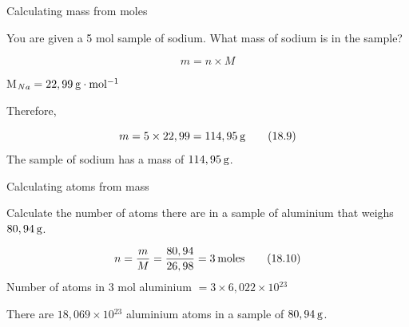    \noindent
\label{m38717*secfhsst!!!underscore!!!id451}\vspace{.5cm} 
      \noindent
      \begin{wex}{Calculating mass from moles }{
\label{m38717*probfhsst!!!underscore!!!id452}
      \label{m38717*id277751}You are given a 5 mol sample of sodium. What mass of sodium is in the sample?\par }
{
      \label{m38717*id277797}\nopagebreak\noindent{}
        
    \begin{equation}
    m=n\ensuremath{\times}M\tag{18.8}
      \end{equation}
      \item  
      \label{m38717*id277822}M${}_{Na}=22,99\phantom{\rule{2pt}{0ex}}\mathrm{g}\ensuremath{\cdot}\mathrm{mol}{}^{-1}$\par 
      \label{m38717*id277857}Therefore,\par 
      \label{m38717*id277862}\nopagebreak\noindent{}
    \begin{equation}
    m=5\ensuremath{\times}22,99=114,95\phantom{\rule{2pt}{0ex}}\mathrm{g}\tag{18.9}
      \end{equation}
      \label{m38717*id277898}The sample of sodium has a mass of  $114,95\phantom{\rule{2pt}{0ex}}\mathrm{g}$.\par 
}
    \end{wex}
    \noindent
\label{m38717*secfhsst!!!underscore!!!id494}\vspace{.5cm} 
      \noindent
      \begin{wex}{Calculating atoms from mass }{
\label{m38717*probfhsst!!!underscore!!!id495}
      \label{m38717*id277914}Calculate the number of atoms there are in a sample of aluminium that weighs $80,94\phantom{\rule{2pt}{0ex}}\mathrm{g}$.\par 
      \vspace{5pt}}
{
      \label{m38717*id277959}\nopagebreak\noindent{}
        
    \begin{equation}
    n=\frac{m}{M}=\frac{80,94}{26,98}=3\phantom{\rule{2pt}{0ex}}\mathrm{moles}\tag{18.10}
      \end{equation}
      \label{m38717*id278019}Number of atoms in 3 mol aluminium $=3\ensuremath{\times}6,022\ensuremath{\times}10{}^{23}$\par 
      \label{m38717*id278053}There are $18,069\ensuremath{\times}10{}^{23}$ aluminium atoms in a sample of $80,94\phantom{\rule{2pt}{0ex}}\mathrm{g}$.\par 
}
    \end{wex}
